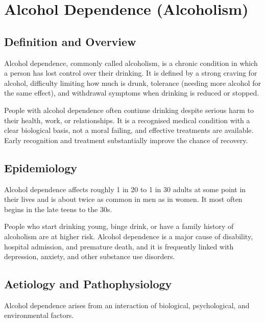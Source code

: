 \chapter{Alcohol Dependence (Alcoholism)}

\section*{Definition and Overview}
Alcohol dependence, commonly called alcoholism, is a chronic condition in which a person has lost control over their drinking. It is defined by a strong craving for alcohol, difficulty limiting how much is drunk, tolerance (needing more alcohol for the same effect), and withdrawal symptoms when drinking is reduced or stopped.

People with alcohol dependence often continue drinking despite serious harm to their health, work, or relationships. It is a recognised medical condition with a clear biological basis, not a moral failing, and effective treatments are available. Early recognition and treatment substantially improve the chance of recovery.

\section*{Epidemiology}
Alcohol dependence affects roughly 1 in 20 to 1 in 30 adults at some point in their lives and is about twice as common in men as in women. It most often begins in the late teens to the 30s.

People who start drinking young, binge drink, or have a family history of alcoholism are at higher risk. Alcohol dependence is a major cause of disability, hospital admission, and premature death, and it is frequently linked with depression, anxiety, and other substance use disorders.

\section*{Aetiology and Pathophysiology}
Alcohol dependence arises from an interaction of biological, psychological, and environmental factors.

